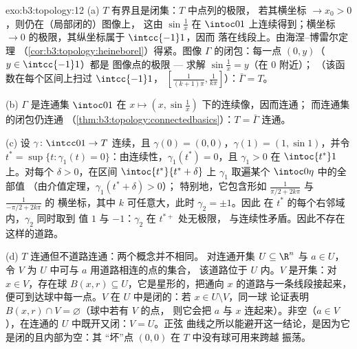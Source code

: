 \begin{solution}{exo:b3:topology:12}
(a) $T$ 有界且是闭集：$T$ 中点列的极限，
若其横坐标 $\to x_0 > 0$，则仍在（局部闭的）图像上，
这由 $\sin\frac1x$ 在 $\intoc01$ 上连续得到；横坐标
$\to 0$ 的极限，其纵坐标属于 $\intcc{-1}1$，因而
落在线段上。由海涅–博雷尔定理
（\cref{cor:b3:topology:heineborel}）得紧。图像
$\Gamma$ 的闭包：每一点 $(0, y)$（$y \in \intcc{-1}1$）都是
图像点的极限 --- 求解 $\sin\frac1x = y$（在 $0$ 附近）；
（该函数在每个区间上扫过 $\intcc{-1}1$，
$[\frac1{(k+1)\pi}, \frac1{k\pi}]$）：$\bar\Gamma = T$。

(b) $\Gamma$ 是连通集
$\intoc01$ 在 $x \mapsto (x, \sin\frac1x)$ 下的连续像，因而连通；
而连通集的闭包仍连通
（\cref{thm:b3:topology:connectedbasics}）：$T = \bar\Gamma$
连通。

(c) 设 $\gamma\colon\intcc01\to T$ 连续，且
$\gamma(0) = (0,0)$，$\gamma(1) = (1, \sin1)$，并令 $t^*
= \sup\{t : \gamma_1(t) = 0\}$：由连续性，$\gamma_1(t^*)
= 0$，且 $\gamma_1 > 0$ 在 $\intoc{t^*}1$ 上。对每个
$\delta > 0$，在区间 $\intoc{t^*}{t^*+\delta}$ 上
$\gamma_1$ 取遍某个 $\intoc0\eta$ 中的全部值
（由介值定理，$\gamma_1(t^* + \delta) > 0$）；
特别地，它包含形如
$\frac1{\pi/2 + 2k\pi}$ 与 $\frac1{-\pi/2 + 2k\pi}$ 的
横坐标，其中 $k$ 可任意大，此时 $\gamma_2 = \pm1$。因此
在 $t^*$ 的每个右邻域内，$\gamma_2$ 同时取到
值 $1$ 与 $-1$：$\gamma_2$ 在 $t^{*+}$ 处无极限，
与连续性矛盾。因此不存在这样的道路。

(d) $T$ 连通但不道路连通：两个概念并不相同。
对连通开集 $U \subseteq \R^n$ 与 $a \in U$，
令 $V$ 为 $U$ 中可与 $a$ 用道路相连的点的集合，
该道路位于 $U$ 内。$V$ 是开集：对 $x \in V$，存在球 $B(x, r)
\subseteq U$，它是星形的，把通向 $x$ 的道路与一条线段接起来，
便可到达球中每一点。$V$ 在
$U$ 中是闭的：若 $x \in U \setminus V$，同一球
论证表明 $B(x, r) \cap V = \varnothing$（球中若有 $V$ 的点，
则它会把 $a$ 与 $x$ 连起来）。非空（$a \in
V$），在连通的 $U$ 中既开又闭：$V = U$。正弦
曲线之所以能避开这一结论，是因为它是闭的且内部为空：其
“坏”点 $(0,0)$ 在 $T$ 中没有球可用来跨越
振荡。
\end{solution}

